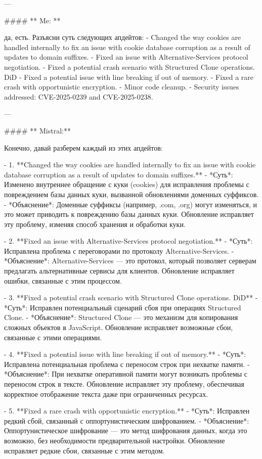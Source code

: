 ---

#### **  Me:  **

да, есть. Разъясни суть следующих апдейтов:
-  Changed the way cookies are handled internally to fix an issue with cookie database corruption as a result of updates to domain suffixes.
-  Fixed an issue with Alternative-Services protocol negotiation.
-  Fixed a potential crash scenario with Structured Clone operations. DiD
-  Fixed a potential issue with line breaking if out of memory.
-  Fixed a rare crash with opportunistic encryption.
-  Minor code cleanup.
-  Security issues addressed: CVE-2025-0239 and CVE-2025-0238.

---

#### ** Mistral:**

Конечно, давай разберем каждый из этих апдейтов:

-  1. **Changed the way cookies are handled internally to fix an issue with cookie database corruption as a result of updates to domain suffixes.**
   - *Суть*: Изменено внутреннее обращение с куки (cookies) для исправления проблемы с повреждением базы данных куки, вызванной обновлениями доменных суффиксов.
   - *Объяснение*: Доменные суффиксы (например, .com, .org) могут изменяться, и это может приводить к повреждению базы данных куки. Обновление исправляет эту проблему, изменяя способ хранения и обработки куки.

-  2. **Fixed an issue with Alternative-Services protocol negotiation.**
   - *Суть*: Исправлена проблема с переговорами по протоколу Alternative-Services.
   - *Объяснение*: Alternative-Services — это протокол, который позволяет серверам предлагать альтернативные сервисы для клиентов. Обновление исправляет ошибки, связанные с этим процессом.

-  3. **Fixed a potential crash scenario with Structured Clone operations. DiD**
   - *Суть*: Исправлен потенциальный сценарий сбоя при операциях Structured Clone.
   - *Объяснение*: Structured Clone — это механизм для копирования сложных объектов в JavaScript. Обновление исправляет возможные сбои, связанные с этими операциями.

-  4. **Fixed a potential issue with line breaking if out of memory.**
   - *Суть*: Исправлена потенциальная проблема с переносом строк при нехватке памяти.
   - *Объяснение*: При нехватке оперативной памяти могут возникать проблемы с переносом строк в тексте. Обновление исправляет эту проблему, обеспечивая корректное отображение текста даже при ограниченных ресурсах.

-  5. **Fixed a rare crash with opportunistic encryption.**
   - *Суть*: Исправлен редкий сбой, связанный с оппортунистическим шифрованием.
   - *Объяснение*: Оппортунистическое шифрование — это метод шифрования данных, когда это возможно, без необходимости предварительной настройки. Обновление исправляет редкие сбои, связанные с этим методом.

